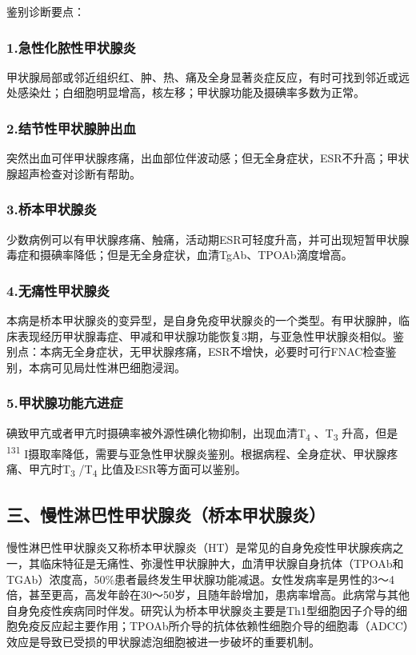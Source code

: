 鉴别诊断要点：

\subsubsection{1.急性化脓性甲状腺炎}

甲状腺局部或邻近组织红、肿、热、痛及全身显著炎症反应，有时可找到邻近或远处感染灶；白细胞明显增高，核左移；甲状腺功能及摄碘率多数为正常。

\subsubsection{2.结节性甲状腺肿出血}

突然出血可伴甲状腺疼痛，出血部位伴波动感；但无全身症状，ESR不升高；甲状腺超声检查对诊断有帮助。

\subsubsection{3.桥本甲状腺炎}

少数病例可以有甲状腺疼痛、触痛，活动期ESR可轻度升高，并可出现短暂甲状腺毒症和摄碘率降低；但是无全身症状，血清TgAb、TPOAb滴度增高。

\subsubsection{4.无痛性甲状腺炎}

本病是桥本甲状腺炎的变异型，是自身免疫甲状腺炎的一个类型。有甲状腺肿，临床表现经历甲状腺毒症、甲减和甲状腺功能恢复3期，与亚急性甲状腺炎相似。鉴别点：本病无全身症状，无甲状腺疼痛，ESR不增快，必要时可行FNAC检查鉴别，本病可见局灶性淋巴细胞浸润。

\subsubsection{5.甲状腺功能亢进症}

碘致甲亢或者甲亢时摄碘率被外源性碘化物抑制，出现血清T\textsubscript{4}
、T\textsubscript{3} 升高，但是\textsuperscript{131}
I摄取率降低，需要与亚急性甲状腺炎鉴别。根据病程、全身症状、甲状腺疼痛、甲亢时T\textsubscript{3}
/T\textsubscript{4} 比值及ESR等方面可以鉴别。

\subsection{三、慢性淋巴性甲状腺炎（桥本甲状腺炎）}

慢性淋巴性甲状腺炎又称桥本甲状腺炎（HT）是常见的自身免疫性甲状腺疾病之一，其临床特征是无痛性、弥漫性甲状腺肿大，血清甲状腺自身抗体（TPOAb和TGAb）浓度高，50\%患者最终发生甲状腺功能减退。女性发病率是男性的3～4倍，甚至更高，高发年龄在30～50岁，且随年龄增加，患病率增高。此病常与其他自身免疫性疾病同时伴发。研究认为桥本甲状腺炎主要是Th1型细胞因子介导的细胞免疫反应起主要作用；TPOAb所介导的抗体依赖性细胞介导的细胞毒（ADCC）效应是导致已受损的甲状腺滤泡细胞被进一步破坏的重要机制。

